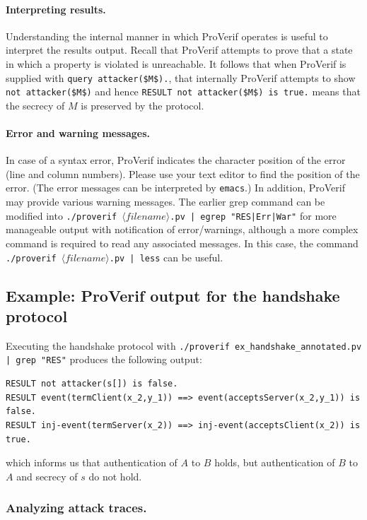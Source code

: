 \documentclass{book}
\newcommand{\nonterm}[1]{\langle\mathit{#1}\rangle}
\newcommand{\filenamevar}{\nonterm{filename}}
\newcommand{\A}{A}
\newcommand{\B}{B}
\begin{document}
\paragraph{Interpreting results.} Understanding the internal manner in which ProVerif operates is useful to interpret the results output. Recall that ProVerif attempts to prove that a state in which a property is violated is unreachable. It follows that when ProVerif is supplied with \lstinline!query attacker($M$).!, that internally ProVerif attempts to show \lstinline!not attacker($M$)! and hence \lstinline!RESULT not attacker($M$) is true.! means that the secrecy of $M$ is preserved by the protocol.

\paragraph{Error and warning messages.}

In case of a syntax error, ProVerif indicates the character position of the error (line and column numbers). Please use your text editor to find the position of the error. (The error messages can be interpreted by \texttt{emacs}.) In addition, ProVerif may provide various warning messages. The earlier grep command can be modified into \texttt{./proverif $\filenamevar$.pv | egrep "RES|Err|War"} for more manageable output with notification of error/warnings, although a more complex command is required to read any associated messages. In this case, the command \texttt{./proverif $\filenamevar$.pv | less} can be useful.

\subsection{Example: ProVerif output for the handshake protocol}\label{sec:output_handshake}

Executing the handshake protocol with \texttt{./proverif {\docexdir}ex\_handshake\_annotated.pv | grep "RES"} produces the following output:
%
\begin{lstlisting}[numbers=none]
RESULT not attacker(s[]) is false.
RESULT event(termClient(x_2,y_1)) ==> event(acceptsServer(x_2,y_1)) is false.
RESULT inj-event(termServer(x_2)) ==> inj-event(acceptsClient(x_2)) is true.
\end{lstlisting}
%
which informs us that authentication of $\A$ to $\B$ holds, but authentication of $\B$ to $\A$ and secrecy of $s$ do not hold.


\subsubsection{Analyzing attack traces.}
\end{document}
